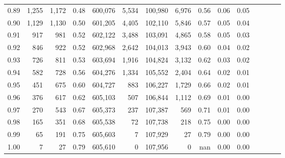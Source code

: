 \begin{tabular}{rrrcrrrrrrrrrrr}
0.89 &   1,255 &  1,172 &                                       0.48 &  600,076 &    5,534 &  100,980 &    6,976 &  0.56 &  0.06 &                         0.05 \\
0.90 &   1,129 &  1,130 &                                       0.50 &  601,205 &    4,405 &  102,110 &    5,846 &  0.57 &  0.05 &                         0.04 \\
0.91 &     917 &    981 &                                       0.52 &  602,122 &    3,488 &  103,091 &    4,865 &  0.58 &  0.05 &                         0.03 \\
0.92 &     846 &    922 &                                       0.52 &  602,968 &    2,642 &  104,013 &    3,943 &  0.60 &  0.04 &                         0.02 \\
0.93 &     726 &    811 &                                       0.53 &  603,694 &    1,916 &  104,824 &    3,132 &  0.62 &  0.03 &                         0.02 \\
0.94 &     582 &    728 &                                       0.56 &  604,276 &    1,334 &  105,552 &    2,404 &  0.64 &  0.02 &                         0.01 \\
0.95 &     451 &    675 &                                       0.60 &  604,727 &      883 &  106,227 &    1,729 &  0.66 &  0.02 &                         0.01 \\
0.96 &     376 &    617 &                                       0.62 &  605,103 &      507 &  106,844 &    1,112 &  0.69 &  0.01 &                         0.00 \\
0.97 &     270 &    543 &                                       0.67 &  605,373 &      237 &  107,387 &      569 &  0.71 &  0.01 &                         0.00 \\
0.98 &     165 &    351 &                                       0.68 &  605,538 &       72 &  107,738 &      218 &  0.75 &  0.00 &                         0.00 \\
0.99 &      65 &    191 &                                       0.75 &  605,603 &        7 &  107,929 &       27 &  0.79 &  0.00 &                         0.00 \\
1.00 &       7 &     27 &                                       0.79 &  605,610 &        0 &  107,956 &        0 &   nan &  0.00 &                         0.00 \\
\bottomrule
\end{tabular}
